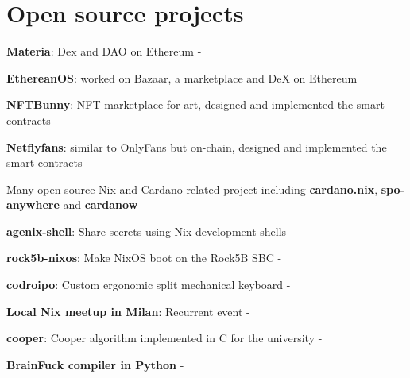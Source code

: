 \documentclass[]{cv}
\begin{document}
\begin{minipage}[t]{0.75\textwidth}
  \section{Open source projects}
  \vspace{+0.5em}
  \begin{tightemize}
  \item \textbf{Materia}: Dex and DAO on Ethereum -
  \item \textbf{EthereanOS}: worked on Bazaar, a marketplace and DeX on Ethereum
  \item \textbf{NFTBunny}: NFT marketplace for art, designed and
    implemented the smart contracts
  \item \textbf{Netflyfans}: similar to OnlyFans but on-chain,
    designed and implemented the smart contracts
  \item Many open source Nix and Cardano related project including
    \textbf{cardano.nix}, \textbf{spo-anywhere} and \textbf{cardanow}
  \item \textbf{agenix-shell}: Share secrets using Nix development
    shells -
  \item \textbf{rock5b-nixos}: Make NixOS boot on the Rock5B SBC -
  \item \textbf{codroipo}: Custom ergonomic split mechanical keyboard
    - 
  \item \textbf{Local Nix meetup in Milan}: Recurrent event -
  \item \textbf{cooper}: Cooper algorithm implemented in C for the
    university -

  \item \textbf{BrainFuck compiler in Python} -
  \end{tightemize}
  \sectionsep


\end{minipage}
\end{document}
